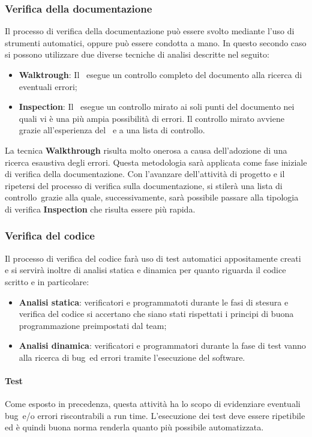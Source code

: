     \subsubsection{Verifica della documentazione}
    Il processo di verifica della documentazione può essere svolto mediante l'uso di strumenti automatici, oppure può essere condotta a mano. In questo secondo caso si possono utilizzare due diverse tecniche di analisi descritte nel seguito:
    \begin{itemize}
        \item \textbf{Walktrough}: Il \roleVerifierLow\ esegue un controllo completo del documento alla ricerca di eventuali errori;
        \item \textbf{Inspection}: Il \roleVerifierLow\ esegue un controllo mirato ai soli punti del documento nei quali vi è una più ampia possibilità di errori. Il controllo mirato avviene grazie all'esperienza del \roleVerifierLow\ e a una lista di controllo\glo.
    \end{itemize}
    La tecnica \textbf{Walkthrough} risulta molto onerosa a causa dell’adozione di una ricerca esaustiva degli errori. Questa metodologia sarà applicata come fase iniziale di verifica della documentazione. Con l'avanzare dell’attività di progetto e il ripetersi del processo di verifica sulla documentazione, si stilerà una lista di controllo\glo\ grazie alla quale, successivamente, sarà possibile passare alla tipologia di verifica \textbf{Inspection} che risulta essere più rapida.

    \subsubsection{Verifica del codice}
    Il processo di verifica del codice farà uso di test automatici appositamente creati e si servirà inoltre di analisi statica e dinamica per quanto riguarda il codice scritto e in particolare:
    \begin{itemize}
        \item \textbf{Analisi statica}: verificatori e programmatoti durante le fasi di stesura e verifica del codice si accertano che siano stati rispettati i principi di buona programmazione preimpostati dal team;
        \item \textbf{Analisi dinamica}: verificatori e programmatori durante la fase di test vanno alla ricerca di bug\glo\ ed errori tramite l'esecuzione del software.  
    \end{itemize}

        \paragraph{Test}
        Come esposto in precedenza, questa attività ha lo scopo di evidenziare eventuali bug\glo\ e/o errori riscontrabili a run time. L'esecuzione dei test deve essere ripetibile ed è quindi buona norma renderla quanto più possibile automatizzata.

